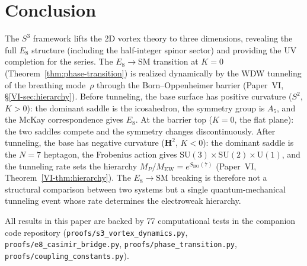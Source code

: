 \section{Conclusion}
\label{sec:conclusion}

The $S^3$ framework lifts the 2D vortex theory to three dimensions,
revealing the full $E_8$ structure (including the half-integer spinor
sector) and providing the UV completion for the series.
The $E_8 \to \mathrm{SM}$ transition at $K = 0$
(Theorem~\ref{thm:phase-transition})
is realized dynamically by the WDW tunneling of the
breathing mode~$\rho$ through the Born--Oppenheimer barrier
(Paper~VI, \S\ref*{VI-sec:hierarchy}).
Before tunneling, the base surface has positive curvature
($S^2$, $K > 0$): the dominant saddle is the icosahedron,
the symmetry group is $A_5$, and the McKay correspondence
gives $E_8$.
At the barrier top ($K = 0$, the flat plane):
the two saddles compete and the symmetry changes
discontinuously.
After tunneling, the base has negative curvature
($\mathbf{H}^2$, $K < 0$): the dominant saddle is the
$N = 7$ heptagon, the Frobenius action gives
$\mathrm{SU}(3) \times \mathrm{SU}(2) \times \mathrm{U}(1)$,
and the tunneling rate sets the hierarchy
$M_P/M_{\mathrm{EW}} = e^{S_{\mathrm{BO}}(7)}$
(Paper~VI, Theorem~\ref*{VI-thm:hierarchy}).
The $E_8 \to \mathrm{SM}$ breaking is therefore not a
structural comparison between two systems but a
single quantum-mechanical tunneling event whose
rate determines the electroweak hierarchy.

All results in this paper are backed by 77 computational tests
in the companion code repository
(\texttt{proofs/s3\_vortex\_dynamics.py},
 \texttt{proofs/e8\_casimir\_bridge.py},
 \texttt{proofs/phase\_transition.py},
 \texttt{proofs/coupling\_constants.py}).





